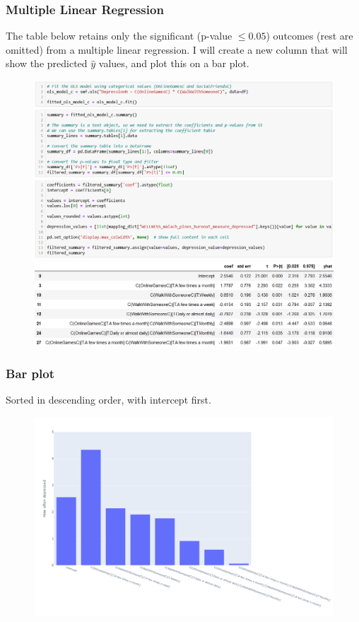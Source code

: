 \documentclass{beamer}
\begin{document}
\begin{frame}

    \frametitle{Multiple Linear Regression}
    
    The table below retains only the significant (p-value $\leq 0.05$) outcomes (rest are omitted) from a multiple linear regression.
    I will create a new column that will show the predicted $\hat y$ values, and plot this on a bar plot.
    \begin{figure}
        \centering
        \includegraphics[width=0.3\linewidth]{jason_regression.png}
        \includegraphics[width=0.8\linewidth]{jason_regressionoutcome.png}
    \end{figure}
    
    \end{frame}

\begin{frame}
    \frametitle{Bar plot}

    {\tiny Sorted in descending order, with intercept first.}

    \begin{figure}
        \centering
        \includegraphics[width=1\linewidth]{jason_barplot.png}
    \end{figure}

\end{frame}
\end{document}
